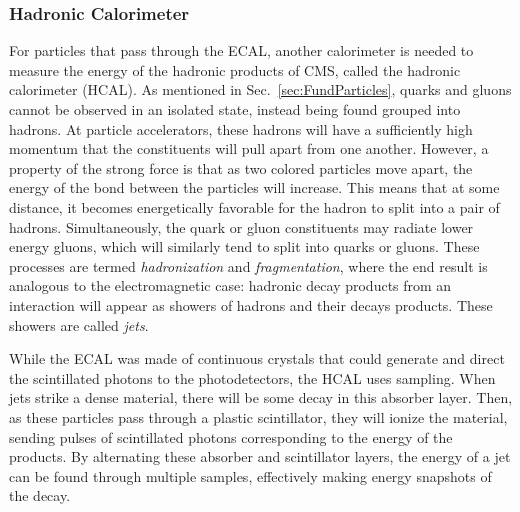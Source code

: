 \subsubsection{Hadronic Calorimeter}
\label{sec:HadrCalo}

For particles that pass through the ECAL, another calorimeter is needed to measure the energy of the hadronic products of CMS, called the hadronic calorimeter (HCAL). As mentioned in Sec.~\ref{sec:FundParticles}, quarks and gluons cannot be observed in an isolated state, instead being found grouped into hadrons. At particle accelerators, these hadrons will have a sufficiently high momentum that the constituents will pull apart from one another. However, a property of the strong force is that as two colored particles move apart, the energy of the bond between the particles will increase. This means that at some distance, it becomes energetically favorable for the hadron to split into a pair of hadrons. Simultaneously, the quark or gluon constituents may radiate lower energy gluons, which will similarly tend to split into quarks or gluons. These processes are termed \textit{hadronization} and \textit{fragmentation}, where the end result is analogous to the electromagnetic case: hadronic decay products from an interaction will appear as showers of hadrons and their decays products. These showers are called \textit{jets}.

While the ECAL was made of continuous crystals that could generate and direct the scintillated photons to the photodetectors, the HCAL uses sampling. When jets strike a dense material, there will be some decay in this absorber layer. Then, as these particles pass through a plastic scintillator, they will ionize the material, sending pulses of scintillated photons corresponding to the energy of the products. By alternating these absorber and scintillator layers, the energy of a jet can be found through multiple samples, effectively making energy snapshots of the decay.

